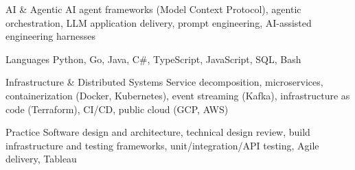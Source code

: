 
\begin{cvskills}
  \cvskill
    {AI \& Agentic} %
    {AI agent frameworks (Model Context Protocol), agentic orchestration, LLM application delivery, prompt engineering, AI-assisted engineering harnesses} %

  \cvskill
    {Languages} %
    {Python, Go, Java, C\#, TypeScript, JavaScript, SQL, Bash} %

  \cvskill
    {Infrastructure \& Distributed Systems} %
    {Service decomposition, microservices, containerization (Docker, Kubernetes), event streaming (Kafka), infrastructure as code (Terraform), CI/CD, public cloud (GCP, AWS)} %

  \cvskill
    {Practice} %
    {Software design and architecture, technical design review, build infrastructure and testing frameworks, unit/integration/API testing, Agile delivery, Tableau} %

\end{cvskills}

